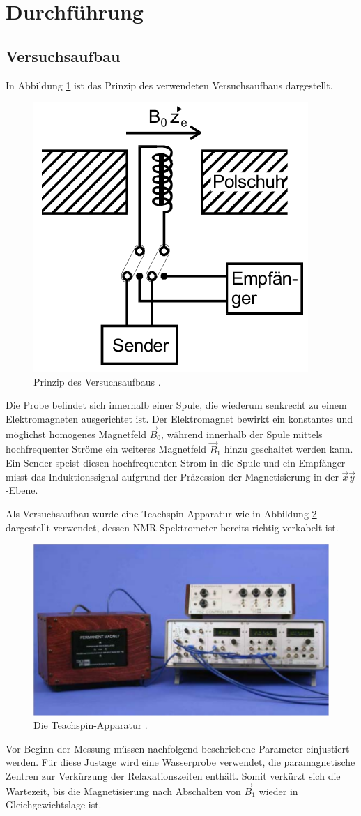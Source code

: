 \newpage
\section{Durchführung}
\label{sec:Durchführung}

\subsection{Versuchsaufbau}
\label{sec:Versuchsaufbau}

In Abbildung \ref{fig:SchemVersuchsaufbau} ist das Prinzip des verwendeten
Versuchsaufbaus dargestellt.
\begin{figure}
  \centering
  \includegraphics[width=.4\textwidth]{images/versuchsaufbau-schema.pdf}
  \caption{Prinzip des Versuchsaufbaus \cite[7]{anleitung}.}
  \label{fig:SchemVersuchsaufbau}
\end{figure}
Die Probe befindet sich innerhalb einer Spule, die wiederum senkrecht zu einem
Elektromagneten ausgerichtet ist.
Der Elektromagnet bewirkt ein konstantes und möglichst homogenes Magnetfeld $\vec{B}_0$,
während innerhalb der Spule mittels hochfrequenter Ströme ein weiteres
Magnetfeld $\vec{B}_1$ hinzu geschaltet werden kann.
Ein Sender speist diesen hochfrequenten Strom in die Spule und ein Empfänger
misst das Induktionssignal aufgrund der Präzession der Magnetisierung
in der $\vec{x} \vec{y}$-Ebene.

Als Versuchsaufbau wurde eine Teachspin-Apparatur wie in Abbildung \ref{fig:Teachspin}
dargestellt verwendet, dessen NMR-Spektrometer bereits richtig verkabelt ist.
\begin{figure}
  \centering
  \includegraphics[width=.7\textwidth]{images/teachspin.pdf}
  \caption{Die Teachspin-Apparatur \cite[17]{anleitung}.}
  \label{fig:Teachspin}
\end{figure}
Vor Beginn der Messung müssen nachfolgend beschriebene Parameter einjustiert werden.
Für diese Justage wird eine Wasserprobe verwendet, die paramagnetische Zentren zur
Verkürzung der Relaxationszeiten enthält.
Somit verkürzt sich die Wartezeit, bis die Magnetisierung nach Abschalten von $\vec{B}_1$
wieder in Gleichgewichtslage ist.


